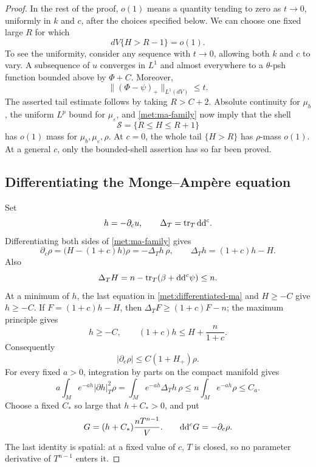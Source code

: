\begin{proof}
In the rest of the proof, \(o(1)\) means a quantity tending to zero
as \(t\to0\), uniformly in \(k\) and \(c\), after the choices specified
below.  We can choose one fixed large \(R\) for which
\begin{equation}
 \label{met:small-volume-tail}
 dV\{H>R-1\}=o(1).
\end{equation}
To see the uniformity, consider any sequence with \(t\to0\), allowing
both \(k\) and \(c\) to vary.  A subsequence of \(u\) converges in
\(L^1\) and almost everywhere to a \(\theta\)-psh function bounded
above by \(\Phi+C\).  Moreover,
\[
 \| (\Phi-\psi)_+\|_{L^1(dV)}\leq t.
\]
The asserted tail estimate follows by taking \(R>C+2\).
Absolute continuity for \(\mu_b\), the uniform \(L^p\) bound for
\(\mu_\varepsilon\), and \eqref{met:ma-family} now imply that the
shell
\begin{equation}
 \label{met:shell}
 \mathcal S=\{R\leq H\leq R+1\}
\end{equation}
has \(o(1)\) mass for \(\mu_b,\mu_\varepsilon,\rho\).
At \(c=0\), the whole tail \(\{H>R\}\) has \(\rho\)-mass \(o(1)\).
At a general \(c\), only the bounded-shell assertion has so far
been proved.

\subsection*{Differentiating the Monge--Amp\`ere equation}

Set
\[
 h=-\partial_cu,
 \qquad \Delta_T=\operatorname{tr}_T\mathrm{d}\mathrm{d}^{c}.
\]
Differentiating both sides of \eqref{met:ma-family} gives
\begin{equation}
 \label{met:differentiated-ma}
 \partial_c\rho
   =\bigl(H-(1+c)h\bigr)\rho
   =-\Delta_T h\,\rho,
 \qquad
 \Delta_T h=(1+c)h-H.
\end{equation}
Also
\[
 \Delta_T H
   =n-\operatorname{tr}_T(\beta+\mathrm{d}\mathrm{d}^{c}\psi)\leq n.
\]
At a minimum of \(h\), the last equation in
\eqref{met:differentiated-ma} and \(H\geq-C\) give \(h\geq-C\).
If \(F=(1+c)h-H\), then
\(\Delta_TF\geq(1+c)F-n\); the maximum principle gives
\begin{equation}
 \label{met:h-bounds}
 h\geq-C,
 \qquad
 (1+c)h\leq H+\frac{n}{1+c}.
\end{equation}
Consequently
\begin{equation}
 \label{met:parameter-variation}
 |\partial_c\rho|\leq C(1+H_+)\rho.
\end{equation}
For every fixed \(a>0\), integration by parts on the compact manifold
gives
\begin{equation}
 \label{met:h-energy}
 a\int_M e^{-ah}|\partial h|_T^2\rho
 =\int_M e^{-ah}\Delta_T h\,\rho
 \leq n\int_Me^{-ah}\rho
 \leq C_a.
\end{equation}
Choose a fixed \(C_*\) so large that \(h+C_*>0\), and put
\begin{equation}
 \label{met:transport-form}
 G=(h+C_*)\frac{nT^{n-1}}V.
 \qquad
 \mathrm{d}\mathrm{d}^{c} G=-\partial_c\rho.
\end{equation}
The last identity is spatial: at a fixed value of \(c\), \(T\) is
closed, so no parameter derivative of \(T^{n-1}\) enters it.


\end{proof}
